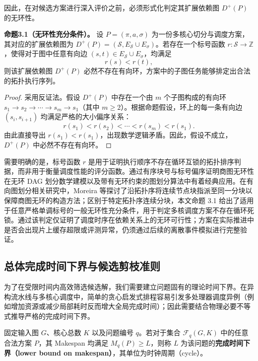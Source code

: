 \documentclass[anonymous,withtoc]{gmcm2026}
\begin{document}
因此，在对候选方案进行深入评价之前，必须形式化判定其扩展依赖图 \(D^+(P)\) 的无环性。

\textbf{命题3.1（无环性充分条件）。} 设 \(P = (\pi, a, \sigma)\) 为一份多核心切分与调度方案，其对应的扩展依赖图为 \(D^+(P) = (\mathcal{S}, E_{\mathcal{S}} \cup E_\sigma)\)。若存在一个标号函数 \(r: \mathcal{S} \to \mathbb{Z}\)，使得对于图中任意有向边 \((s, t) \in E_{\mathcal{S}} \cup E_\sigma\)，均满足 \begin{equation}
r(s) < r(t),
\end{equation} 则该扩展依赖图 \(D^+(P)\) 必然不存在有向环，方案中的子图任务能够排定出合法的拓扑执行序列。

\begin{proof} 采用反证法。假设 \(D^+(P)\) 中存在一个由 \(m\) 个子图构成的有向环 \(s_1 \to s_2 \to \cdots \to s_m \to s_1\)（其中 \(m \ge 2\)）。根据命题假设，环上的每一条有向边 \((s_i, s_{i+1})\) 均满足严格的大小偏序关系： \begin{equation}
r(s_1) < r(s_2) < \cdots < r(s_m) < r(s_1).
\end{equation} 由此直接导出 \(r(s_1) < r(s_1)\)，出现数学逻辑矛盾。因此，假设不成立，\(D^+(P)\) 中必然不存在有向环。 \end{proof}

需要明确的是，标号函数 \(r\) 是用于证明执行顺序不存在循环互锁的拓扑排序判据，而非用于衡量调度性能的评分函数。通过有序块号与标号偏序证明商图无环性在无环 DAG 划分数学建模\cite{ref7}以及带有无环约束的图划分算法\cite{ref18}中有着经典应用。在有向图划分相关研究中，Moreira 等\cite{ref18}探讨了沿拓扑序将连续节点块指派至同一分块以保障商图无环的构造方法；区别于特定拓扑序连续分块，本文命题 3.1 给出了适用于任意严格单调标号的一般无环性充分条件，用于判定多核调度方案不存在循环死锁。通过该判定仅证明了调度时序在依赖关系上的无环可行性；方案在实际推进中是否会出现片上缓存超限或评测异常，仍须通过后续的离散事件模拟进行完整验证。

\subsection{总体完成时间下界与候选剪枝准则}

为了在受限时间内高效筛选候选解，我们需要建立问题固有的理论时间下界。在异构流水线与多核心调度中，简单的贪心启发式排程容易引发多处理器调度异例（例如增加资源或减少局部耗时反而增大全局完成时间）\cite{ref2}；因此需要结合物理必要不等式推导严格的完成时间下界。

固定输入图 \(G\)、核心总数 \(K\) 以及问题编号 \(q\)。若对于集合 \(\mathcal{F}_q(G, K)\) 中的任意合法方案 \(P\)，其 Makespan 均满足 \(M_q(P) \ge L\)，则称 \(L\) 为该问题的\textbf{完成时间下界（lower bound on makespan）}，其单位为时钟周期（cycle）。
\end{document}
